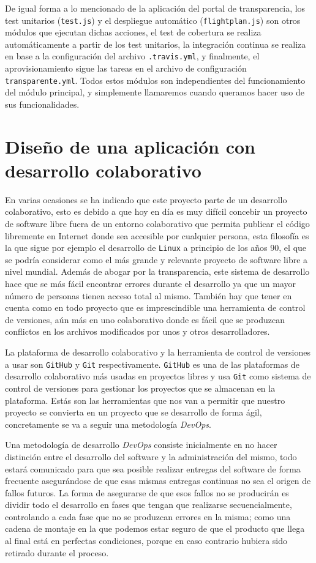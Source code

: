 \bigskip
De igual forma a lo mencionado de la aplicación del portal de transparencia, los test unitarios ({\tt test.js}) y el despliegue automático ({\tt flightplan.js}) son otros módulos que ejecutan dichas acciones, el test de cobertura se realiza automáticamente a partir de los test unitarios, la integración continua se realiza en base a la configuración del archivo {\tt .travis.yml}, y finalmente, el aprovisionamiento sigue las tareas en el archivo de configuración {\tt transparente.yml}. Todos estos módulos son independientes del funcionamiento del módulo principal, y simplemente llamaremos cuando queramos hacer uso de sus funcionalidades.

\newpage
\section{Diseño de una aplicación con desarrollo colaborativo}

En varias ocasiones se ha indicado que este proyecto parte de un desarrollo colaborativo, esto es debido a que hoy en día es muy difícil concebir un proyecto de software libre fuera de un entorno colaborativo que permita publicar el código libremente en Internet donde sea accesible por cualquier persona, esta filosofía es la que sigue por ejemplo el desarrollo de {\tt Linux} a principio de los años 90, el que se podría considerar como el más grande y relevante proyecto de software libre a nivel mundial. Además de abogar por la transparencia, este sistema de desarrollo hace que se más fácil encontrar errores durante el desarrollo ya que un mayor número de personas tienen acceso total al mismo. También hay que tener en cuenta como en todo proyecto que es imprescindible una herramienta de control de versiones, aún más en uno colaborativo donde es fácil que se produzcan conflictos en los archivos modificados por unos y otros desarrolladores.

\bigskip
La plataforma de desarrollo colaborativo y la herramienta de control de versiones a usar son {\tt GitHub} y {\tt Git} respectivamente. {\tt GitHub} es una de las plataformas de desarrollo colaborativo más usadas en proyectos libres y usa {\tt Git} como sistema de control de versiones para gestionar los proyectos que se almacenan en la plataforma. Estás son las herramientas que nos van a permitir que nuestro proyecto se convierta en un proyecto que se desarrollo de forma ágil, concretamente se va a seguir una metodología \textit{DevOps}.

\bigskip
Una metodología de desarrollo \textit{DevOps} consiste inicialmente en no hacer distinción entre el desarrollo del software y la administración del mismo, todo estará comunicado para que sea posible realizar entregas del software de forma frecuente asegurándose de que esas mismas entregas continuas no sea el origen de fallos futuros. La forma de asegurarse de que esos fallos no se producirán es dividir todo el desarrollo en fases que tengan que realizarse secuencialmente, controlando a cada fase que no se produzcan errores en la misma; como una cadena de montaje en la que podemos estar seguro de que el producto que llega al final está en perfectas condiciones, porque en caso contrario hubiera sido retirado durante el proceso.

